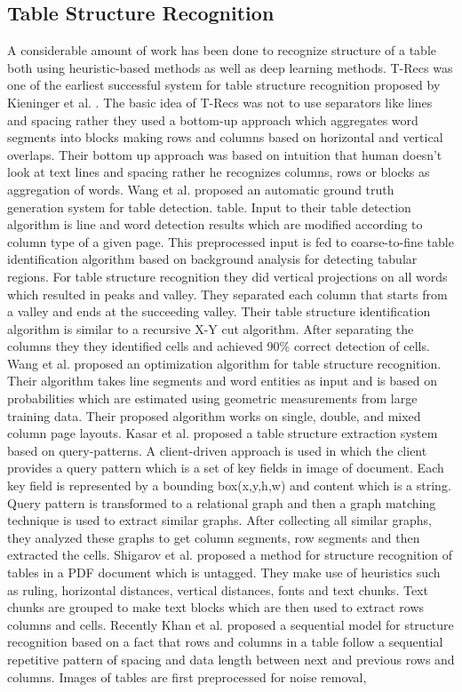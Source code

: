 \subsection{Table Structure Recognition}
\label{sec:relatedWork_Structure}
A considerable amount of work has been done to recognize structure of a table both using heuristic-based methods as well as deep learning methods. T-Recs was one of the earliest successful system for table structure recognition proposed by Kieninger et al. \cite{kieninger1998t}. The basic idea of T-Recs was not to use separators like lines and spacing rather they used a bottom-up approach which aggregates word segments into blocks making rows and columns based on horizontal and vertical overlaps. Their bottom up approach was based on intuition that human doesn't look at text lines and spacing rather he recognizes columns, rows or blocks as aggregation of words. Wang et al. \cite{wangt2001automatic} proposed an automatic ground truth generation system for table detection. table. Input to their table detection algorithm is line and word detection results which are modified according to column type of a given page. This preprocessed input is fed to coarse-to-fine table identification algorithm based on background analysis for detecting tabular regions. For table structure recognition they did vertical projections on all words which resulted in peaks and valley. They separated each column that starts from a valley and ends at the succeeding valley. Their table structure identification algorithm is similar to a recursive X-Y cut algorithm. After separating the columns they they identified cells and achieved 90\% correct detection of cells. Wang et al. \cite{wang2004table}proposed an optimization algorithm for table structure recognition. Their algorithm takes line segments and word entities as input and is based on probabilities which are estimated using geometric measurements from large training data. Their proposed algorithm works on single, double, and mixed column page layouts. Kasar et al. \cite{kasar2015table} proposed a table structure extraction system based on query-patterns. A client-driven approach is used in which the client provides a query pattern which is a set of key fields in image of document. Each key field is represented by a bounding box(x,y,h,w) and content which is a string. Query pattern is transformed to a relational graph and then a graph matching technique is used to extract similar graphs. After collecting all similar graphs, they analyzed these graphs to get column segments, row segments and then extracted the cells. Shigarov et al. \cite{shigarov2016configurable} proposed a method for structure recognition of tables in a PDF document which is untagged. They make use of heuristics such as ruling, horizontal distances, vertical distances, fonts and text chunks. Text chunks are grouped to make text blocks which are then used to extract rows columns and cells. Recently Khan et al. \cite{khan2019table} proposed a sequential model for structure recognition based on a fact that rows and columns in a table follow a sequential repetitive pattern of spacing and data length between next and previous rows and columns. Images of tables are first preprocessed for noise removal, 